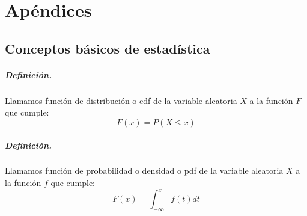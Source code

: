 
%
%
%
%
%
%
%
%

\chapter{Ap\'endices}
\label{sec:apendixes}

\section{Conceptos b\'asicos de estad\'istica}
\label{apendix:stats}

\paragraph{Definici\'on.} Llamamos funci\'on de distribuci\'on o cdf de la
variable aleatoria $X$ a la funci\'on $F$ que cumple:
\begin{displaymath}
F(x) = P(X \leq x)
\end{displaymath}

\paragraph{Definici\'on.} Llamamos funci\'on de probabilidad o densidad o pdf
 de la variable aleatoria $X$ a la funci\'on $f$ que cumple:
\begin{displaymath}
F(x) = \int_{-\infty}^{x} f(t) dt
\end{displaymath}


